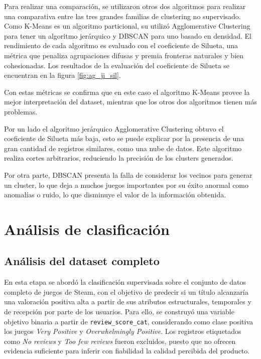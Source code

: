 \documentclass[conference]{IEEEtran}
\begin{document}
Para realizar una comparación, se utilizaron otros dos algoritmos para realizar una comparativa entre las tres grandes familias de clustering no supervisado. Como K-Means es un algoritmo particional, su utilizó Agglomerative Clustering para tener un algoritmo jerárquico y DBSCAN para uno basado en densidad. El rendimiento de cada algoritmo es evaluado con el coeficiente de Silueta, una métrica que penaliza agrupaciones difusas y premia fronteras naturales y bien cohesionadas. Los resultados de la evaluación del coeficiente de Silueta se encuentran en la figura \ref{fig:ag_ji_sil}.

Con estas métricas se confirma que en este caso el algoritmo K-Means provee la mejor interpretación del dataset, mientras que los otros dos algoritmos tienen más problemas.

Por un lado el algoritmo jerárquico Agglomerative Clustering obtuvo el coeficiente de Silueta más baja, esto se puede explicar por la presencia de una gran cantidad de registros similares, como una nube de datos. Este algoritmo realiza cortes arbitrarios, reduciendo la precisión de los clusters generados.

Por otra parte, DBSCAN presenta la falla de considerar los vecinos para generar un cluster, lo que deja a muchos juegos importantes por su éxito anormal como anomalías o ruido, lo que disminuye el valor de la información obtenida.

\section{Análisis de clasificación}

\subsection{Análisis del dataset completo}

En esta etapa se abordó la clasificación supervisada sobre el conjunto de datos completo de juegos de Steam, con el objetivo de predecir si un título alcanzaría una valoración positiva alta a partir de sus atributos estructurales, temporales y de recepción por parte de los usuarios. Para ello, se construyó una variable objetivo binaria a partir de \texttt{review\_score\_cat}, considerando como clase positiva los juegos \textit{Very Positive} y \textit{Overwhelmingly Positive}. Los registros etiquetados como \textit{No reviews} y \textit{Too few reviews} fueron excluidos, puesto que no ofrecen evidencia suficiente para inferir con fiabilidad la calidad percibida del producto.
\end{document}
